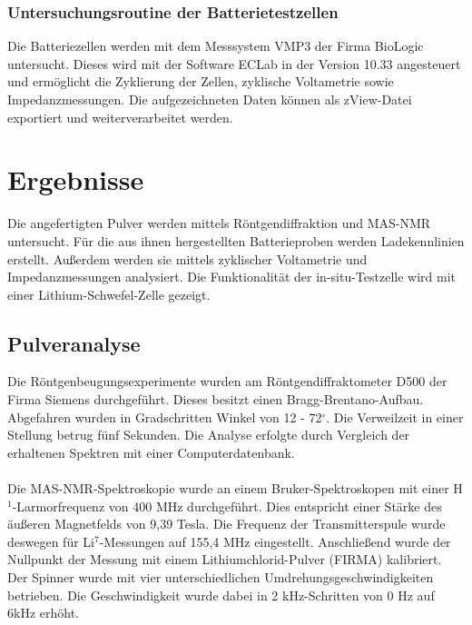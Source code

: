 \documentclass[a4paper, 11pt, headsepline,footsepline,twoside,abstract]{scrbook}
\begin{document}
\subsection{Untersuchungsroutine der Batterietestzellen} %
Die Batteriezellen werden mit dem Messsystem VMP3 der Firma BioLogic untersucht. Dieses wird mit der Software ECLab in der Version 10.33 angesteuert und ermöglicht die Zyklierung der Zellen, zyklische Voltametrie sowie Impedanzmessungen. Die aufgezeichneten Daten können als zView-Datei exportiert und weiterverarbeitet werden.
\chapter{Ergebnisse}
Die angefertigten Pulver werden mittels Röntgendiffraktion und MAS-NMR untersucht. Für die aus ihnen hergestellten Batterieproben werden Ladekennlinien erstellt. Außerdem werden sie mittels zyklischer Voltametrie und Impedanzmessungen analysiert. Die Funktionalität der in-situ-Testzelle wird mit einer Lithium-Schwefel-Zelle gezeigt.
\section{Pulveranalyse}
Die Röntgenbeugungsexperimente wurden am Röntgendiffraktometer D500 der Firma Siemens durchgeführt. Dieses besitzt einen Bragg-Brentano-Aufbau. Abgefahren wurden in Gradschritten Winkel von 12 - 72$^\circ$. Die Verweilzeit in einer Stellung betrug fünf Sekunden. Die Analyse erfolgte durch Vergleich der erhaltenen Spektren mit einer Computerdatenbank.
\\\\
Die MAS-NMR-Spektroskopie wurde an einem Bruker-Spektroskopen mit einer H$^1$-Larmor\-frequenz von 400 MHz durchgeführt. Dies entspricht einer Stärke des äußeren Magnetfelds von 9,39 Tesla. Die Frequenz der Transmitterspule wurde deswegen für Li$^7$-Messungen auf 155,4 MHz eingestellt. Anschließend wurde der Nullpunkt der Messung mit einem Lithiumchlorid-Pulver (FIRMA) kalibriert. Der Spinner wurde mit vier unterschiedlichen Umdrehungsgeschwindigkeiten betrieben. Die Geschwindigkeit wurde dabei in 2 kHz-Schritten von 0 Hz auf 6kHz erhöht.
\newpage
\end{document}
